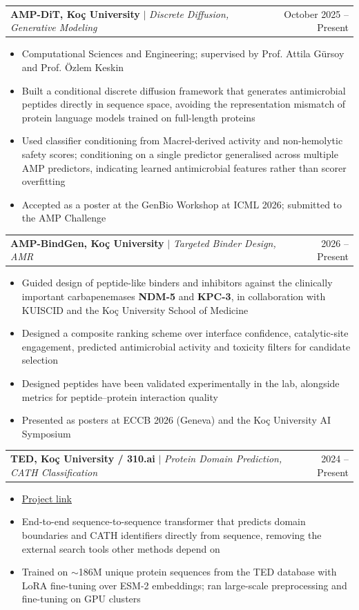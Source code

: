 \documentclass[letterpaper,11pt]{article}
\makeatletter
\newcommand{\resumeItem}[1]{\item\small{#1\vspace{-2pt}}}
\newcommand{\resumeProjectHeading}[2]{
    \item
    \begin{tabular*}{0.97\textwidth}{l@{\extracolsep{\fill}}r}
      \small#1 & #2 \\
    \end{tabular*}\vspace{-7pt}
}
\newcommand{\resumeItemListStart}{\begin{itemize}}
\newcommand{\resumeItemListEnd}{\end{itemize}\vspace{-5pt}}
\makeatother
\begin{document}
        \resumeProjectHeading
        {\textbf{AMP-DiT, Ko\c{c} University} $|$ \footnotesize\emph{Discrete Diffusion, Generative Modeling}}{October 2025 -- Present}
        \resumeItemListStart
            \resumeItem{Computational Sciences and Engineering; supervised by Prof. Attila G\"{u}rsoy and Prof. \"{O}zlem Keskin}
            \resumeItem{Built a conditional discrete diffusion framework that generates antimicrobial peptides directly in sequence space, avoiding the representation mismatch of protein language models trained on full-length proteins}
            \resumeItem{Used classifier conditioning from Macrel-derived activity and non-hemolytic safety scores; conditioning on a single predictor generalised across multiple AMP predictors, indicating learned antimicrobial features rather than scorer overfitting}
            \resumeItem{Accepted as a poster at the GenBio Workshop at ICML 2026; submitted to the AMP Challenge}
        \resumeItemListEnd

        \resumeProjectHeading
        {\textbf{AMP-BindGen, Ko\c{c} University} $|$ \footnotesize\emph{Targeted Binder Design, AMR}}{2026 -- Present}
        \resumeItemListStart
            \resumeItem{Guided design of peptide-like binders and inhibitors against the clinically important carbapenemases \textbf{NDM-5} and \textbf{KPC-3}, in collaboration with KUISCID and the Ko\c{c} University School of Medicine}
            \resumeItem{Designed a composite ranking scheme over interface confidence, catalytic-site engagement, predicted antimicrobial activity and toxicity filters for candidate selection}
            \resumeItem{Designed peptides have been validated experimentally in the lab, alongside metrics for peptide--protein interaction quality}
            \resumeItem{Presented as posters at ECCB 2026 (Geneva) and the Ko\c{c} University AI Symposium}
        \resumeItemListEnd

        \resumeProjectHeading
        {\textbf{TED, Ko\c{c} University / 310.ai} $|$ \footnotesize\emph{Protein Domain Prediction, CATH Classification}}{2024 -- Present}
        \resumeItemListStart
            \resumeItem{\href{https://github.com/Alirzeanoroozi/TED}{\underline{Project link}}}
            \resumeItem{End-to-end sequence-to-sequence transformer that predicts domain boundaries and CATH identifiers directly from sequence, removing the external search tools other methods depend on}
            \resumeItem{Trained on $\sim$186M unique protein sequences from the TED database with LoRA fine-tuning over ESM-2 embeddings; ran large-scale preprocessing and fine-tuning on GPU clusters}
        \resumeItemListEnd
\end{document}
